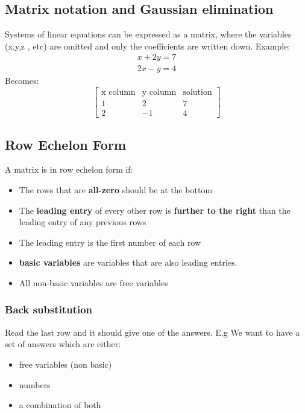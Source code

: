 \documentclass[11pt]{book}
\begin{document}
\subsection{Matrix notation and Gaussian elimination}
\par{Systems of linear equations can be expressed as a matrix, where the variables (x,y,z , etc) are omitted and only the coefficients are written down. Example:
\begin{align}
	x+2y=7 \\
	2x-y=4
\end{align}
Becomes:
\[
\left[
\begin{array}{cc|c}
	\text{x column} & \text{y column} & \text{solution} \\
	1 & 2 & 7 \\
	2 & -1 & 4
\end{array}
\right]
\]
\subsection{Row Echelon Form}
\par{A matrix is in row echelon form if:
	\begin{itemize}
		\item{The rows that are \textbf{all-zero} should be at the bottom}
		\item{The \textbf{leading entry} of every other row is \textbf{further to the right} than the leading entry of any previous rows}
		\item{The leading entry is the first number of each row}
		\item{\textbf{basic variables} are variables that are also leading entries.}
		\item{All non-basic variables are free variables}
	\end{itemize}
}
\subsubsection{Back substitution}
\par{Read the last row and it should give one of the answers. E.g We want to have a set of answers which are either:
\begin{itemize}
	\item{free variables (non basic)}
	\item{numbers}
	\item{a combination of both}
\end{itemize}}
}
\end{document}
